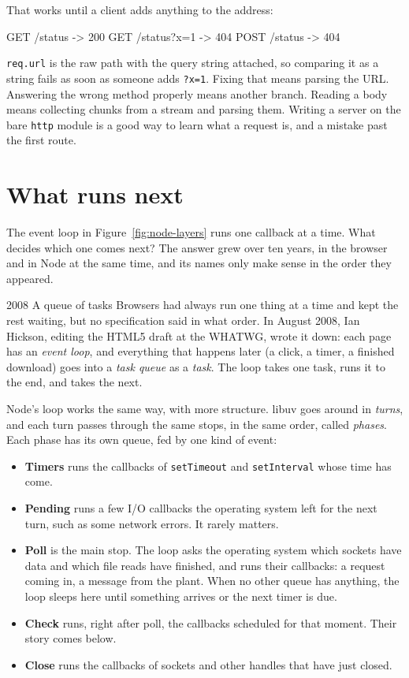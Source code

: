 That works until a client adds anything to the address:

\begin{terminal}
GET  /status        -> 200
GET  /status?x=1    -> 404
POST /status        -> 404
\end{terminal}

\texttt{req.url} is the raw path with the query string attached, so comparing
it as a string fails as soon as someone adds \texttt{?x=1}. Fixing that means
parsing the URL. Answering the wrong method properly means another branch.
Reading a body means collecting chunks from a stream and parsing them. Writing
a server on the bare \texttt{http} module is a good way to learn what a request
is, and a mistake past the first route.

\section{What runs next}

The event loop in Figure~\ref{fig:node-layers} runs one callback at a time. What
decides which one comes next? The answer grew over ten years, in the browser and
in Node at the same time, and its names only make sense in the order they
appeared.

\begin{history}{2008 \textperiodcentered{} A queue of tasks}
Browsers had always run one thing at a time and kept the rest waiting, but no
specification said in what order. In August 2008, Ian Hickson, editing the HTML5
draft at the WHATWG, wrote it down: each page has an \emph{event loop}, and
everything that happens later (a click, a timer, a finished download) goes into
a \emph{task queue} as a \emph{task}. The loop takes one task, runs it to the
end, and takes the next.
\end{history}

Node's loop works the same way, with more structure. libuv goes around in
\emph{turns}, and each turn passes through the same stops, in the same order,
called \emph{phases}. Each phase has its own queue, fed by one kind of event:

\begin{itemize}
\item \textbf{Timers} runs the callbacks of \texttt{setTimeout} and
  \texttt{setInterval} whose time has come.
\item \textbf{Pending} runs a few I/O callbacks the operating system left for
  the next turn, such as some network errors. It rarely matters.
\item \textbf{Poll} is the main stop. The loop asks the operating system which
  sockets have data and which file reads have finished, and runs their
  callbacks: a request coming in, a message from the plant. When no other
  queue has anything, the loop sleeps here until something arrives or the next
  timer is due.
\item \textbf{Check} runs, right after poll, the callbacks scheduled for that
  moment. Their story comes below.
\item \textbf{Close} runs the callbacks of sockets and other handles that have
  just closed.
\end{itemize}

